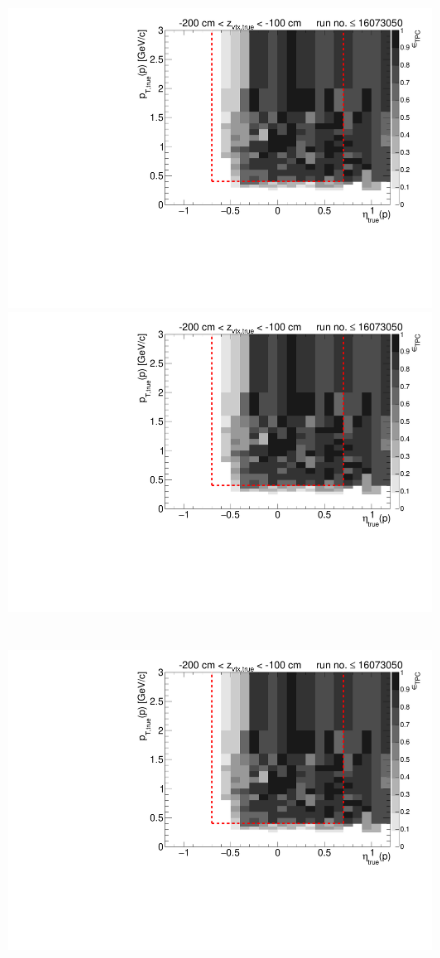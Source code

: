 \begin{figure}[hb]
{  \includegraphics[width=\linewidth,page=7]{graphics/eff/Eff2D_TPC_proton_Plus_RunRange1.pdf}\\
  \includegraphics[width=\linewidth,page=9]{graphics/eff/Eff2D_TPC_proton_Plus_RunRange1.pdf}
}~
\parbox{0.495\textwidth}{
  \centering
  \includegraphics[width=\linewidth,page=4]{graphics/eff/Eff2D_TPC_proton_Plus_RunRange1.pdf}\\
}
\end{figure}
